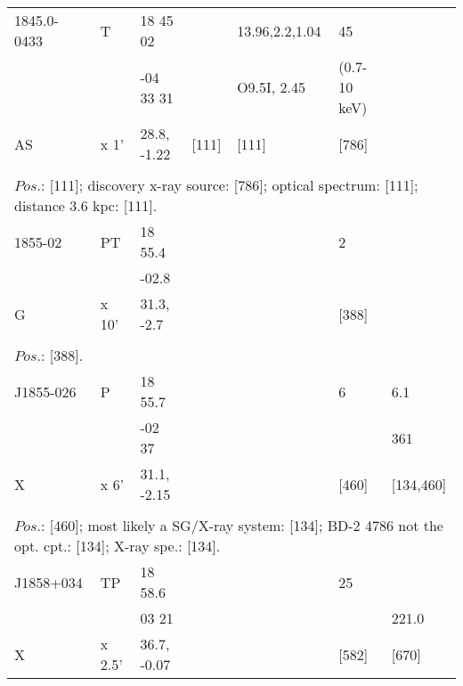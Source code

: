 \documentclass{aa}
\begin{document}
\begin{table*}[h]
\begin{tabular}{p{2.5cm}p{1cm}p{1.8cm}p{2.3cm}p{3.3cm}p{2.0cm}p{2.2cm}}
\noalign{\smallskip}
\hline
\noalign{\smallskip}
1845.0-0433 &    T   &    18 45 02   &               &        13.96,2.2,1.04 & 45                          &     \\                                           
                       &          &   -04 33 31   &               &    O9.5I, 2.45          &  (0.7-10 keV)         &        \\                       
AS                  &  x 1' &  28.8, -1.22   &   [111]   &         [111]                  &  [786]                   &       \\
  
\\
\multicolumn{7}{p{17.5cm}}{
$Pos$.: [111]; discovery x-ray source: [786]; optical spectrum: [111]; distance 3.6 kpc: [111].          }\\

\noalign{\smallskip}
\hline
\noalign{\smallskip}
 1855-02      & PT       & 18 55.4        &                    &                      & 2                 &                        \\
                      &           & -02.8           &                    &                     &                           &          \\
G             & x 10'          & 31.3, -2.7  &                     &                      & [388]        &           \\
\\
\multicolumn{7}{p{17.5cm}}{
$Pos$.: [388].}\\

\noalign{\smallskip}
\hline
\noalign{\smallskip}
J1855-026  &  P     &     18 55.7   &                 &            &       6          &     6.1  \\
                     &          &    -02 37      &                 &            &                   &    361   \\
X                  &  x 6'  & 31.1, -2.15  &                &            &      [460]     &  [134,460]  \\
  
\\
\multicolumn{7}{p{17.5cm}}{
$Pos$.: [460]; most likely a SG/X-ray system: [134]; BD-2 4786 not the opt. cpt.: [134]; X-ray spe.: [134].    }\\

\noalign{\smallskip}
\hline
\noalign{\smallskip}
J1858+034  &  TP    &     18 58.6   &                &                   &        25       &             \\                
                      &            &     03 21      &                 &                   &                    & 221.0  \\
X                   & x 2.5' & 36.7, -0.07  &                 &                   &   [582]         &       [670] \\
  

\end{tabular}
\end{table*}
\end{document}
